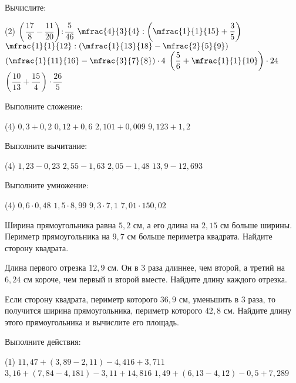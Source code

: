 \begin{class}[number=3]
	\begin{listofex}
		\item Вычислите:
		\begin{tasks}(2)
			\task \( \left( \dfrac{17}{8}-\dfrac{11}{20} \right):\dfrac{5}{46} \)
			\task \( \mfrac{4}{3}{4}:\left( \mfrac{1}{1}{15}+\dfrac{3}{5} \right) \)
			\task \( \mfrac{1}{1}{12}:\left( \mfrac{1}{13}{18}-\mfrac{2}{5}{9} \right) \)
			\task \( \left( \mfrac{1}{11}{16}-\mfrac{3}{7}{8} \right)\cdot4 \)
			\task \( \left( \dfrac{5}{6}+\mfrac{1}{1}{10} \right)\cdot24 \)
			\task \( \left( \dfrac{10}{13}+\dfrac{15}{4} \right)\cdot\dfrac{26}{5} \)
		\end{tasks}
		\item Выполните сложение:
		\begin{tasks}(4)
			\task \( 0,3+0,2 \)
			\task \( 0,12+0,6 \)
			\task \( 2,101+0,009 \)
			\task \( 9,123+1,2 \)
		\end{tasks}
		\item Выполните вычитание:
		\begin{tasks}(4)
			\task \( 1,23-0,23 \)
			\task \( 2,55-1,63 \)
			\task \( 2,05-1,48 \)
			\task \( 13,9-12,693 \)
		\end{tasks}
		\item Выполните умножение:
		\begin{tasks}(4)
			\task \( 0,6\cdot0,48 \)
			\task \( 1,5\cdot8,99 \)
			\task \( 9,3\cdot7,1 \)
			\task \( 7,01\cdot150,02 \)
		\end{tasks}
		\item Ширина прямоугольника равна \( 5,2 \) см, а его длина на \( 2,15 \) см больше ширины. Периметр прямоугольника на \( 9,7 \) см больше периметра квадрата. Найдите сторону квадрата.
		\item Длина первого отрезка \( 12,9 \) см. Он в \( 3 \) раза длиннее, чем второй, а третий на \( 6,24 \) см короче, чем первый и второй вместе. Найдите длину каждого отрезка.
		\item Если сторону квадрата, периметр которого \( 36,9 \) см, уменьшить в 3 раза, то получится ширина прямоугольника, периметр которого \( 42,8 \) см. Найдите длину этого прямоугольника и вычислите его площадь.
	\end{listofex}
\end{class}

\begin{class}[number=4]
	\begin{listofex}
		\item Выполните действия:
		\begin{tasks}(1)
			\task \( 11,47+(3,89-2,11)-4,416+3,711 \)
			\task \( 3,16+(7,84-4,181)-3,11+14,816 \)
			\task \( 1,49+(6,13-4,12)-0,5+7,289 \)
		\end{tasks}
	\end{listofex}
\end{class}

